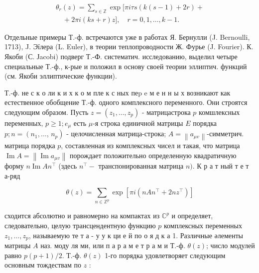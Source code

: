 \documentclass[10pt]{article}
\begin{document}
\[

\begin{gathered}

\theta_{r}(z)=\sum_{s \in \mathbb{Z}} \exp [\pi i \tau s(k(s-1)+2 r)+ \\

\quad+2 \pi i(k s+r) z], \quad r=0,1, \ldots, k-1 .

\end{gathered}

\]



Отдельные примеры Т.-ф. встречаются уже в работах Я. Бернулли (J. Bernoulli, 1713), J. Эїлера (L. Euler), в теории теплопроводности Ж. Фурье (J. Fourier). К. Якоби (С. Јacobi) подверг Т.-Ф. систематич. исследованию, выделил четыре специальные Т.-ф., к-рые и положил в основу своей теории эллиптич. функций (см. Якоби эллиптические функции).



Т.-ф. не с к о ли к и х к о м пле к с ных пеp e м е н н ы х возникают как естественное обобщение Т.-ф. одного комплексного переменного. Они строятся следующим образом. Пусть $z=\left(z_{1}, \ldots, z_{p}\right)$ - матрицастрока $p$ комшлексных переменных, $p \geqslant 1 ; e_{\mu}$ есть $\mu$-я строка единичной матрицы $E$ порядка $p ; n=\left(n_{1}, \ldots\right.$, $\left.n_{p}\right)$ - целочисленная матрица-строка; $A=\left\|a_{\mu v}\right\|$-симметрич. матрица порядка $p$, составленная из комплексных чисел и такая, что матрица $\operatorname{Im} A=\left\|\operatorname{Im} a_{\mu v}\right\|$ порождает положительно определенную квадратичную форму $n \operatorname{Im} A n^{\top}$ (здесь $n^{\top}-$ транспонированная матрица $n)$. К р а т ный т е т а-ряд



\[

\theta(z)=\sum_{n \in \mathbb{Z}^{p}} \exp \left[\pi i\left(n A n^{\top}+2 n z^{\top}\right)\right]

\]



сходится абсолютно и равномерно на компактах из $\mathbb{C}^{p}$ и определяет, следовательно, целую трансцендентную функцию $p$ комплексных переменных $z_{1}, \ldots, z_{p}$, называемую те т а - у у к ци е й по о я д к а 1. Различные әлементы матрицы $A$ наз. моду ля ми, или п а р а м е т р а м и Т.-ф. $\theta(z)$; число модулей равно $p(p+1) / 2$. Т.-ф. $\theta(z)$ 1-го порядка удовлетворяет следующим основным тождествам по $z$ :
\end{document}
